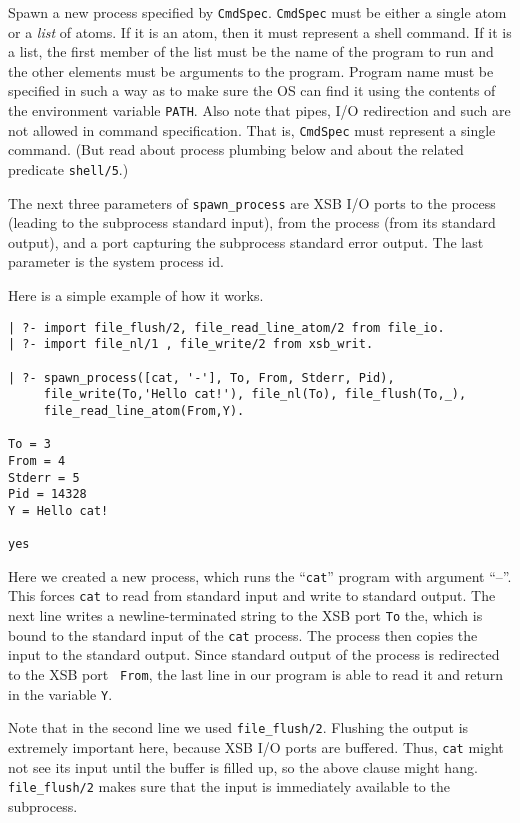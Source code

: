 \begin{description}
Spawn a new process specified by {\tt CmdSpec}. {\tt CmdSpec} must be
either a single atom or a \emph{list} of atoms.
If it is an atom, then it must represent a shell command.
If it is a list, the first member of the list must be the name of the
program to run and the 
other elements must be arguments to the program. Program name must be specified
in such a way as to make sure the OS can find it using the contents of the
environment variable {\tt PATH}.
Also note that pipes, I/O redirection and such are not allowed in command
specification. That is, {\tt CmdSpec} must represent a single command.
(But read about process plumbing below and about the related predicate
{\tt shell/5}.)

The next three parameters of \verb|spawn_process| are XSB I/O ports
to the process (leading to the subprocess standard input), from the process
(from its standard output), and a port capturing the
subprocess standard error output. The last parameter is the system process id.
\end{description}

\noindent
Here is a simple example of how it works.

\begin{verbatim}
| ?- import file_flush/2, file_read_line_atom/2 from file_io.
| ?- import file_nl/1 , file_write/2 from xsb_writ.  

| ?- spawn_process([cat, '-'], To, From, Stderr, Pid),
     file_write(To,'Hello cat!'), file_nl(To), file_flush(To,_),
     file_read_line_atom(From,Y).

To = 3
From = 4
Stderr = 5
Pid = 14328
Y = Hello cat!

yes
\end{verbatim}

Here we created a new process, which runs the ``{\tt cat}'' program
with argument ``--''. This forces {\tt cat} to read from standard input and
write to standard output. The next line writes a newline-terminated string
to the XSB port {\tt To} the, which is bound to the standard input of the
{\tt cat} process. The process then copies the input to the standard output.
Since standard output of the process is redirected to the XSB port {\tt
  From}, the last line in our program is able to read it and return in the
variable {\tt Y}.

Note that in the second line we used {\tt file\_flush/2}. Flushing the
output is extremely important here, because XSB I/O ports are buffered.
Thus, {\tt cat} might not see its input until the buffer is filled up, so
the above clause might hang. {\tt file\_flush/2} makes sure that the input
is immediately available to the subprocess.

